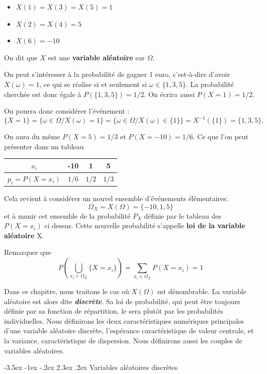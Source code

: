 \documentclass[]{book}
\makeatletter
\renewcommand\section{\@startsection {section}{1}{\z@}%
                                   {-3.5ex \@plus -1ex \@minus -.2ex}%
                                   {2.3ex \@plus.2ex}%
                                   {\normalfont\Large\bfseries\color{ForestGreen}}}
\theoremstyle{magentacolor}
\theoremstyle{proprie}
\theoremstyle{exstyle}
\theoremstyle{exostyle}
\theoremstyle{definition}
\theoremstyle{definition}
\theoremstyle{definition}
\theoremstyle{remark}
\makeatother
\begin{document}
\begin{itemize}
\item
  \(X(1) = X(3) = X(5) = 1\)
\item
  \(X(2) = X(4) = 5\)
\item
  \(X(6) = -10\)
\end{itemize}

On dit que \(X\) est une {\textbf{variable aléatoire}} sur
\(\Omega\).

On peut s'intéresser à la probabilité de gagner 1 euro, c'est-à-dire
d'avoir \(X(\omega) = 1\), ce qui se réalise si et seulement si
\(\omega \in \{1,3,5\}\). La probabilité cherchée est donc égale à
\(P(\{1,3,5\}) = 1/2\). On écrira aussi \(P(X=1) = 1/2\).

On pourra donc considérer l'événement :
\[\{X=1\} = \{\omega \in \Omega / X(\omega) = 1\} = \{\omega \in \Omega / X(\omega) \in \{1\}\}  = X^{-1} (\{1\}) = \{1,3,5\}.\]

On aura du même \(P(X=5) = 1/3\) et \(P(X=-10) = 1/6\). Ce que l'on peut
présenter dans un tableau

\begin{longtable}[]{@{}cccc@{}}
\toprule
\(x_i\) & -10 & 1 & 5\tabularnewline
\midrule
\endhead
\(p_i=P(X = x_i)\) & \(1/6\) & \(1/2\) & \(1/3\)\tabularnewline
\bottomrule
\end{longtable}

Cela revient à considérer un nouvel ensemble d'événements élémentaires:
\[\Omega_X = X(\Omega)= \{-10,1,5\}\] et à munir cet ensemble de la
probabilité \(P_X\) définie par le tableau des \(P(X=x_i)\) ci dessus. Cette
nouvelle probabilité s'appelle {\textbf{loi de la variable
aléatoire}} X.

Remarquer que
\[P(\bigcup_{x_i \in \Omega_X} \{X=x_i\}) = \sum_{x_i \in \Omega_X} P(X=x_i) = 1\]

Dans ce chapitre, nous traitons le cas où \(X(\Omega)\) est dénombrable.
La variable aléatoire est alors dite \textbf{\emph{discrète}}. Sa loi de
probabilité, qui peut être toujours définie par sa fonction de
répartition, le sera plutôt par les probabilités individuelles. Nous
définirons les deux caractéristiques numériques principales d'une
variable aléatoire discrète, l'espérance caractéristique de valeur
centrale, et la variance, caractéristique de dispersion. Nous définirons
aussi les couples de variables aléatoires.

\hypertarget{variables-aleatoires-discretes-1}{%
\section{Variables aléatoires discrètes}\label{variables-aleatoires-discretes-1}}
\end{document}
